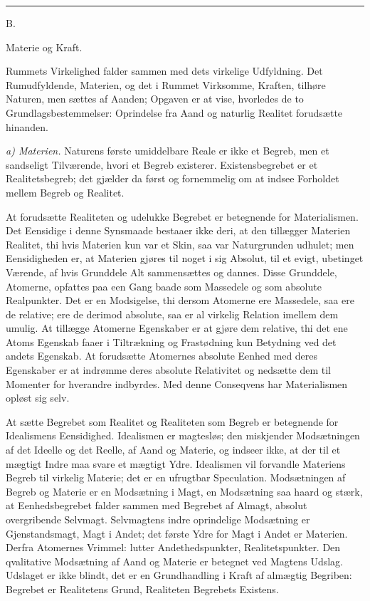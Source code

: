 \documentclass[12pt,a4paper]{book}
\newcommand{\afdeling}[2]{%
  \par\vspace{1.3\baselineskip}%
  {\centering #1\par\vspace{0.2\baselineskip}\normalsize #2\par}%
  \addcontentsline{toc}{section}{#1 #2}%
  \vspace{0.8\baselineskip}\par\nointerlineskip}
\newcommand{\streg}{\begin{center}\rule{2cm}{0.4pt}\end{center}}
\newcommand{\runin}[1]{\emph{#1}\hspace{0.4em}}
\begin{document}
\streg

\afdeling{B.}{Materie og Kraft.}

Rummets Virkelighed falder sammen med dets virkelige Udfyldning. Det
Rumudfyldende, Materien, og det i Rummet Virksomme, Kraften, tilhøre
Naturen, men sættes af Aanden; Opgaven er at vise, hvorledes de to
Grundlagsbestemmelser: Oprindelse fra Aand og naturlig Realitet
forudsætte hinanden.

\runin{a) Materien.} Naturens første umiddelbare Reale er ikke et
Begreb, men et sandseligt Tilværende, hvori et Begreb existerer.
Existensbegrebet er et Realitetsbegreb; det gjælder da først og
fornemmelig om at indsee Forholdet mellem Begreb og Realitet.

At forudsætte Realiteten og udelukke Begrebet er betegnende for
Materialismen. Det Eensidige i denne Synsmaade bestaaer ikke deri, at
den tillægger Materien Realitet, thi hvis Materien kun var et Skin,
saa var Naturgrunden udhulet; men Eensidigheden er, at Materien gjøres
til noget
i sig Absolut, til et evigt, ubetinget Værende, af hvis Grunddele Alt
sammensættes og dannes. Disse Grunddele, Atomerne, opfattes paa een
Gang baade som Massedele og som absolute Realpunkter. Det er en
Modsigelse, thi dersom Atomerne ere Massedele, saa ere de relative; ere
de derimod absolute, saa er al virkelig Relation imellem dem umulig.
At tillægge Atomerne Egenskaber er at gjøre dem relative, thi det ene
Atoms Egenskab faaer i Tiltrækning og Frastødning kun Betydning ved det
andets Egenskab. At forudsætte Atomernes absolute Eenhed med deres
Egenskaber er at indrømme deres absolute Relativitet og nedsætte dem
til Momenter for hverandre indbyrdes. Med denne Conseqvens har
Materialismen opløst sig selv.

At sætte Begrebet som Realitet og Realiteten som Begreb er betegnende
for Idealismens Eensidighed. Idealismen er magtesløs; den miskjender
Modsætningen af det Ideelle og det Reelle, af Aand og Materie, og
indseer ikke, at der til et mægtigt Indre maa svare et mægtigt Ydre.
Idealismen vil forvandle Materiens Begreb til virkelig Materie; det er
en ufrugtbar Speculation. Modsætningen af Begreb og Materie er en
Modsætning i Magt, en Modsætning saa haard og stærk, at
Eenhedsbegrebet falder sammen med Begrebet af Almagt, absolut
overgribende Selvmagt. Selvmagtens indre oprindelige Modsætning er
Gjenstandsmagt, Magt i Andet; det første Ydre for Magt i Andet er
Materien. Derfra Atomernes Vrimmel: lutter Andethedspunkter,
Realitetspunkter. Den qvalitative Modsætning af Aand og Materie er
betegnet ved Magtens Udslag. Udslaget er ikke blindt, det er en
Grundhandling i Kraft af almægtig Begriben: Begrebet er Realitetens
Grund, Realiteten Begrebets Existens.
\end{document}
